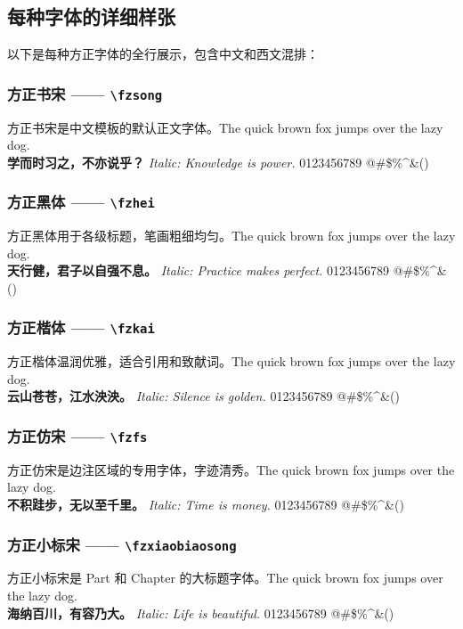 \subsection{每种字体的详细样张}

以下是每种方正字体的全行展示，包含中文和西文混排：

\subsubsection{方正书宋 —— \texttt{\textbackslash fzsong}}
{\fzsong
\noindent 方正书宋是中文模板的默认正文字体。The quick brown fox jumps over the lazy dog.\\
\textbf{学而时习之，不亦说乎？} \textit{Italic: Knowledge is power.} 0123456789 @\#\$\%\textasciicircum\&\*()
}

\subsubsection{方正黑体 —— \texttt{\textbackslash fzhei}}
{\fzhei
\noindent 方正黑体用于各级标题，笔画粗细均匀。The quick brown fox jumps over the lazy dog.\\
\textbf{天行健，君子以自强不息。} \textit{Italic: Practice makes perfect.} 0123456789 @\#\$\%\textasciicircum\&\*()
}

\subsubsection{方正楷体 —— \texttt{\textbackslash fzkai}}
{\fzkai
\noindent 方正楷体温润优雅，适合引用和致献词。The quick brown fox jumps over the lazy dog.\\
\textbf{云山苍苍，江水泱泱。} \textit{Italic: Silence is golden.} 0123456789 @\#\$\%\textasciicircum\&\*()
}

\subsubsection{方正仿宋 —— \texttt{\textbackslash fzfs}}
{\fzfs
\noindent 方正仿宋是边注区域的专用字体，字迹清秀。The quick brown fox jumps over the lazy dog.\\
\textbf{不积跬步，无以至千里。} \textit{Italic: Time is money.} 0123456789 @\#\$\%\textasciicircum\&\*()
}

\subsubsection{方正小标宋 —— \texttt{\textbackslash fzxiaobiaosong}}
{\fzxiaobiaosong
\noindent 方正小标宋是 Part 和 Chapter 的大标题字体。The quick brown fox jumps over the lazy dog.\\
\textbf{海纳百川，有容乃大。} \textit{Italic: Life is beautiful.} 0123456789 @\#\$\%\textasciicircum\&\*()
}

